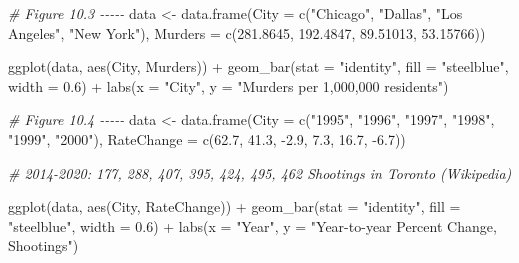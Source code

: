\documentclass[
]{book}
\newenvironment{Shaded}{\begin{snugshade}}{\end{snugshade}}
\newcommand{\AttributeTok}[1]{\textcolor[rgb]{0.77,0.63,0.00}{#1}}
\newcommand{\CommentTok}[1]{\textcolor[rgb]{0.56,0.35,0.01}{\textit{#1}}}
\newcommand{\FloatTok}[1]{\textcolor[rgb]{0.00,0.00,0.81}{#1}}
\newcommand{\FunctionTok}[1]{\textcolor[rgb]{0.00,0.00,0.00}{#1}}
\newcommand{\NormalTok}[1]{#1}
\newcommand{\OtherTok}[1]{\textcolor[rgb]{0.56,0.35,0.01}{#1}}
\newcommand{\SpecialCharTok}[1]{\textcolor[rgb]{0.00,0.00,0.00}{#1}}
\newcommand{\StringTok}[1]{\textcolor[rgb]{0.31,0.60,0.02}{#1}}
\begin{document}
\begin{Shaded}
\begin{Highlighting}[]
\CommentTok{\# Figure 10.3 {-}{-}{-}{-}{-}}
\NormalTok{data }\OtherTok{\textless{}{-}} \FunctionTok{data.frame}\NormalTok{(}\AttributeTok{City =} \FunctionTok{c}\NormalTok{(}\StringTok{"Chicago"}\NormalTok{, }\StringTok{"Dallas"}\NormalTok{, }\StringTok{"Los Angeles"}\NormalTok{, }\StringTok{"New York"}\NormalTok{), }
                   \AttributeTok{Murders =} \FunctionTok{c}\NormalTok{(}\FloatTok{281.8645}\NormalTok{, }\FloatTok{192.4847}\NormalTok{, }\FloatTok{89.51013}\NormalTok{, }\FloatTok{53.15766}\NormalTok{)) }

\FunctionTok{ggplot}\NormalTok{(data, }\FunctionTok{aes}\NormalTok{(City, Murders)) }\SpecialCharTok{+} 
  \FunctionTok{geom\_bar}\NormalTok{(}\AttributeTok{stat =} \StringTok{"identity"}\NormalTok{, }\AttributeTok{fill =} \StringTok{"steelblue"}\NormalTok{, }\AttributeTok{width =} \FloatTok{0.6}\NormalTok{) }\SpecialCharTok{+} 
  \FunctionTok{labs}\NormalTok{(}\AttributeTok{x =} \StringTok{"City"}\NormalTok{, }\AttributeTok{y =} \StringTok{"Murders per 1,000,000 residents"}\NormalTok{)}

\CommentTok{\# Figure 10.4 {-}{-}{-}{-}{-}}
\NormalTok{data }\OtherTok{\textless{}{-}} \FunctionTok{data.frame}\NormalTok{(}\AttributeTok{City =} \FunctionTok{c}\NormalTok{(}\StringTok{"1995"}\NormalTok{, }\StringTok{"1996"}\NormalTok{, }\StringTok{"1997"}\NormalTok{, }\StringTok{"1998"}\NormalTok{, }\StringTok{"1999"}\NormalTok{, }\StringTok{"2000"}\NormalTok{), }
                   \AttributeTok{RateChange =} \FunctionTok{c}\NormalTok{(}\FloatTok{62.7}\NormalTok{, }\FloatTok{41.3}\NormalTok{, }\SpecialCharTok{{-}}\FloatTok{2.9}\NormalTok{, }\FloatTok{7.3}\NormalTok{, }\FloatTok{16.7}\NormalTok{, }\SpecialCharTok{{-}}\FloatTok{6.7}\NormalTok{)) }

\CommentTok{\# 2014{-}2020: 177, 288, 407, 395, 424, 495, 462 Shootings in Toronto (Wikipedia)}

\FunctionTok{ggplot}\NormalTok{(data, }\FunctionTok{aes}\NormalTok{(City, RateChange)) }\SpecialCharTok{+} 
  \FunctionTok{geom\_bar}\NormalTok{(}\AttributeTok{stat =} \StringTok{"identity"}\NormalTok{, }\AttributeTok{fill =} \StringTok{"steelblue"}\NormalTok{, }\AttributeTok{width =} \FloatTok{0.6}\NormalTok{) }\SpecialCharTok{+} 
  \FunctionTok{labs}\NormalTok{(}\AttributeTok{x =} \StringTok{"Year"}\NormalTok{, }\AttributeTok{y =} \StringTok{"Year{-}to{-}year Percent Change, Shootings"}\NormalTok{)}


\end{Highlighting}
\end{Shaded}
\end{document}
